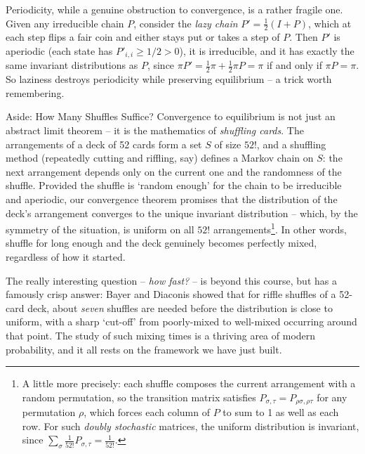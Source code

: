 \begin{remark}
	Periodicity, while a genuine obstruction to convergence, is a rather fragile one. Given any irreducible chain $P$, consider the \emph{lazy chain} $P' = \frac{1}{2}(I + P)$, which at each step flips a fair coin and either stays put or takes a step of $P$. Then $P'$ is aperiodic (each state has $P'_{i,i} \geq 1/2 > 0$), it is irreducible, and it has exactly the same invariant distributions as $P$, since $\pi P' = \frac{1}{2}\pi + \frac{1}{2}\pi P = \pi$ if and only if $\pi P = \pi$. So laziness destroys periodicity while preserving equilibrium -- a trick worth remembering.
\end{remark}

\begin{aside}{Aside: How Many Shuffles Suffice?}
	Convergence to equilibrium is not just an abstract limit theorem -- it is the mathematics of \emph{shuffling cards}. The arrangements of a deck of 52 cards form a set $S$ of size $52!$, and a shuffling method (repeatedly cutting and riffling, say) defines a Markov chain on $S$: the next arrangement depends only on the current one and the randomness of the shuffle. Provided the shuffle is `random enough' for the chain to be irreducible and aperiodic, our convergence theorem promises that the distribution of the deck's arrangement converges to the unique invariant distribution -- which, by the symmetry of the situation, is uniform on all $52!$ arrangements\footnote{A little more precisely: each shuffle composes the current arrangement with a random permutation, so the transition matrix satisfies $P_{\sigma, \tau} = P_{\rho\sigma, \rho\tau}$ for any permutation $\rho$, which forces each column of $P$ to sum to 1 as well as each row. For such \emph{doubly stochastic} matrices, the uniform distribution is invariant, since $\sum_{\sigma} \frac{1}{52!} P_{\sigma, \tau} = \frac{1}{52!}$.}. In other words, shuffle for long enough and the deck genuinely becomes perfectly mixed, regardless of how it started.

	The really interesting question -- \emph{how fast?} -- is beyond this course, but has a famously crisp answer: Bayer and Diaconis showed that for riffle shuffles of a 52-card deck, about \emph{seven} shuffles are needed before the distribution is close to uniform, with a sharp `cut-off' from poorly-mixed to well-mixed occurring around that point. The study of such mixing times is a thriving area of modern probability, and it all rests on the framework we have just built.

\end{aside}

